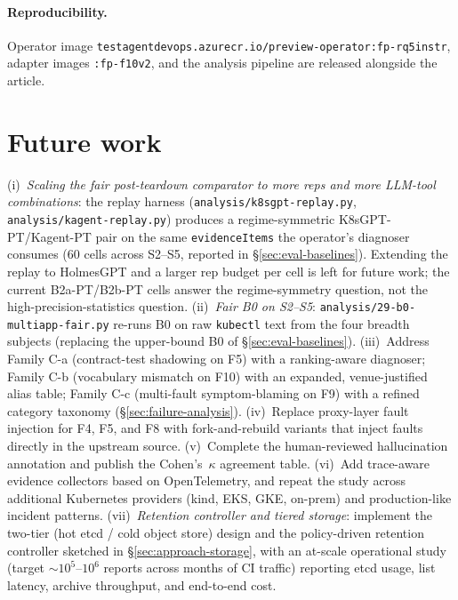 \documentclass[sigconf, nonacm=true, anonymous=false, review=false]{acmart}
\newcommand{\artifactname}[1]{\nolinkurl{#1}}
\newcommand{\fn}[1]{F#1\xspace}
\begin{document}
\paragraph{Reproducibility.} Operator image
\artifactname{testagentdevops.azurecr.io/preview-operator:fp-rq5instr},
adapter images \artifactname{:fp-f10v2}, and the analysis pipeline are
released alongside the article.

\section{Future work}
\label{sec:future}

(i)~\emph{Scaling the fair post-teardown comparator to more reps and
more LLM-tool combinations}: the replay harness
(\texttt{analysis/k8sgpt-replay.py}, \texttt{analysis/kagent-replay.py})
produces a regime-symmetric K8sGPT-PT/Kagent-PT pair on the same
\texttt{evidenceItems} the operator's diagnoser consumes (60 cells across
S2--S5, reported in \S\ref{sec:eval-baselines}). Extending the replay to
HolmesGPT and a larger rep budget per cell is left for future work; the
current B2a-PT/B2b-PT cells answer the regime-symmetry question, not the
high-precision-statistics question.
(ii)~\emph{Fair B0 on S2--S5}: \texttt{analysis/29-b0-multiapp-fair.py}
re-runs B0 on raw \texttt{kubectl} text from the four breadth subjects
(replacing the upper-bound B0 of \S\ref{sec:eval-baselines}).
(iii)~Address Family C-a (contract-test shadowing on \fn{5}) with a
ranking-aware diagnoser; Family C-b (vocabulary mismatch on \fn{10}) with
an expanded, venue-justified alias table; Family C-c (multi-fault
symptom-blaming on \fn{9}) with a refined category taxonomy
(\S\ref{sec:failure-analysis}).
(iv)~Replace proxy-layer fault injection for \fn{4}, \fn{5}, and \fn{8}
with fork-and-rebuild variants that inject faults directly in the upstream
source.
(v)~Complete the human-reviewed hallucination annotation and publish the
Cohen's~$\kappa$ agreement table.
(vi)~Add trace-aware evidence collectors based on
OpenTelemetry, and repeat the study across additional Kubernetes
providers (kind, EKS, GKE, on-prem) and production-like incident patterns.
(vii)~\emph{Retention controller and tiered storage}: implement the
two-tier (hot etcd / cold object store) design and the policy-driven
retention controller sketched in §\ref{sec:approach-storage}, with an
at-scale operational study (target $\sim$$10^5$--$10^6$ reports across
months of CI traffic) reporting etcd usage, list latency, archive
throughput, and end-to-end cost.
\end{document}
